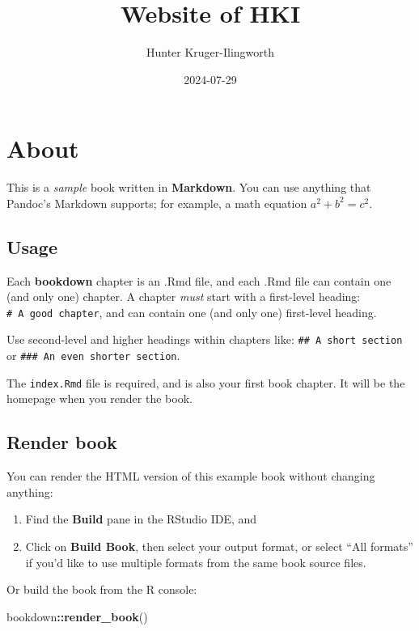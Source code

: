 \documentclass[
]{book}
\title{Website of HKI}
\author{Hunter Kruger-Ilingworth}
\date{2024-07-29}
\newenvironment{Shaded}{\begin{snugshade}}{\end{snugshade}}
\newcommand{\FunctionTok}[1]{\textcolor[rgb]{0.13,0.29,0.53}{\textbf{#1}}}
\newcommand{\NormalTok}[1]{#1}
\newcommand{\SpecialCharTok}[1]{\textcolor[rgb]{0.81,0.36,0.00}{\textbf{#1}}}
\theoremstyle{definition}
\theoremstyle{definition}
\theoremstyle{definition}
\theoremstyle{definition}
\theoremstyle{remark}
\begin{document}
\maketitle

{
\setcounter{tocdepth}{1}
\tableofcontents
}
\hypertarget{about}{%
\chapter{About}\label{about}}

This is a \emph{sample} book written in \textbf{Markdown}. You can use anything that Pandoc's Markdown supports; for example, a math equation \(a^2 + b^2 = c^2\).

\hypertarget{usage}{%
\section{Usage}\label{usage}}

Each \textbf{bookdown} chapter is an .Rmd file, and each .Rmd file can contain one (and only one) chapter. A chapter \emph{must} start with a first-level heading: \texttt{\#\ A\ good\ chapter}, and can contain one (and only one) first-level heading.

Use second-level and higher headings within chapters like: \texttt{\#\#\ A\ short\ section} or \texttt{\#\#\#\ An\ even\ shorter\ section}.

The \texttt{index.Rmd} file is required, and is also your first book chapter. It will be the homepage when you render the book.

\hypertarget{render-book}{%
\section{Render book}\label{render-book}}

You can render the HTML version of this example book without changing anything:

\begin{enumerate}
\def\labelenumi{\arabic{enumi}.}
\item
  Find the \textbf{Build} pane in the RStudio IDE, and
\item
  Click on \textbf{Build Book}, then select your output format, or select ``All formats'' if you'd like to use multiple formats from the same book source files.
\end{enumerate}

Or build the book from the R console:

\begin{Shaded}
\begin{Highlighting}[]
\NormalTok{bookdown}\SpecialCharTok{::}\FunctionTok{render\_book}\NormalTok{()}
\end{Highlighting}
\end{Shaded}
\end{document}
